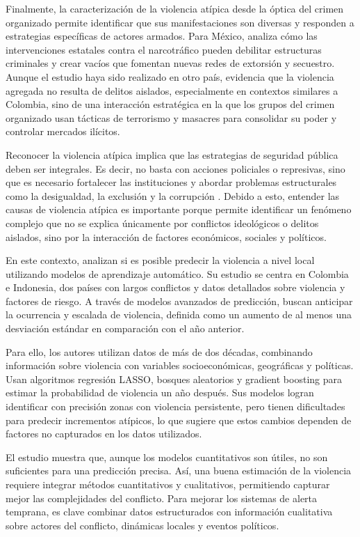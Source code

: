 Finalmente, la caracterización de la violencia atípica desde la óptica del crimen organizado permite identificar que sus manifestaciones son diversas y responden a estrategias específicas de actores armados. Para México, \citet{acemoglu2015} analiza cómo las intervenciones estatales contra el narcotráfico pueden debilitar estructuras criminales y crear vacíos que fomentan nuevas redes de extorsión y secuestro. Aunque el estudio haya sido realizado en otro país, evidencia que la violencia agregada no resulta de delitos aislados, especialmente en contextos similares a Colombia, sino de una interacción estratégica en la que los grupos del crimen organizado usan tácticas de terrorismo y masacres para consolidar su poder y controlar mercados ilícitos.

Reconocer la violencia atípica implica que las estrategias de seguridad pública deben ser integrales. Es decir, no basta con acciones policiales o represivas, sino que es necesario fortalecer las instituciones y abordar problemas estructurales como la desigualdad, la exclusión y la corrupción \citet{deas1995}. Debido a esto, entender las causas de violencia atípica es importante porque permite identificar un fenómeno complejo que no se explica únicamente por conflictos ideológicos o delitos aislados, sino por la interacción de factores económicos, sociales y políticos.

En este contexto, \citet{Bazzi2022} analizan si es posible predecir la violencia a nivel local utilizando modelos de aprendizaje automático. Su estudio se centra en Colombia e Indonesia, dos países con largos conflictos y datos detallados sobre violencia y factores de riesgo. A través de modelos avanzados de predicción, buscan anticipar la ocurrencia y escalada de violencia, definida como un aumento de al menos una desviación estándar en comparación con el año anterior.

Para ello, los autores utilizan datos de más de dos décadas, combinando información sobre violencia con variables socioeconómicas, geográficas y políticas. Usan algoritmos  regresión LASSO, bosques aleatorios y gradient boosting para estimar la probabilidad de violencia un año después. Sus modelos logran identificar con precisión zonas con violencia persistente, pero tienen dificultades para predecir incrementos atípicos, lo que sugiere que estos cambios dependen de factores no capturados en los datos utilizados.

El estudio muestra que, aunque los modelos cuantitativos son útiles, no son suficientes para una predicción precisa. Así, una buena estimación de la violencia requiere integrar métodos cuantitativos y cualitativos, permitiendo capturar mejor las complejidades del conflicto. Para mejorar los sistemas de alerta temprana, es clave combinar datos estructurados con información cualitativa sobre actores del conflicto, dinámicas locales y eventos políticos.